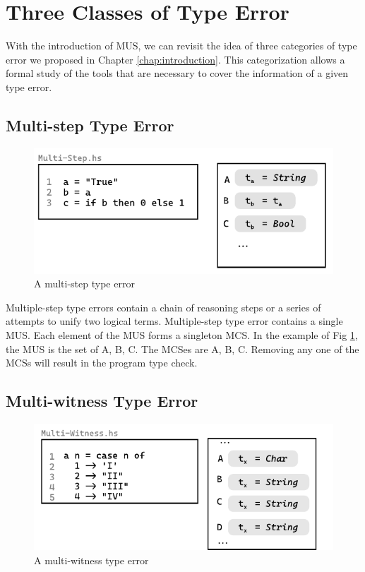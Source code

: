
\section{Three Classes of Type Error}
With the introduction of MUS, we can revisit the idea of three categories of type error we proposed in Chapter \ref{chap:introduction}. This categorization allows a formal study of the tools that are necessary to cover the information of a given type error. 

\subsection{Multi-step Type Error}
\begin{figure}[hbt]

  \includegraphics[width=0.5\linewidth]{Multi-Step-2}
  \caption{
    \label{fig:multi-step-2}
    A multi-step type error
  }
\end{figure}
Multiple-step type errors contain a chain of reasoning steps or a series of attempts to unify two logical terms. Multiple-step type error contains a single MUS. Each element of the MUS forms a singleton MCS. In the example of Fig \ref{fig:multi-step-2}, the MUS is the set of {A, B, C}. The MCSes are {A}, {B}, {C}. Removing any one of the MCSs will result in the program type check.

\subsection{Multi-witness Type Error}
\begin{figure}[hbt]
  \includegraphics[width=0.5\linewidth]{Multi-Witness-2}
  \caption{
    \label{fig:multi-witness-2}
    A multi-witness type error
  }
\end{figure}

